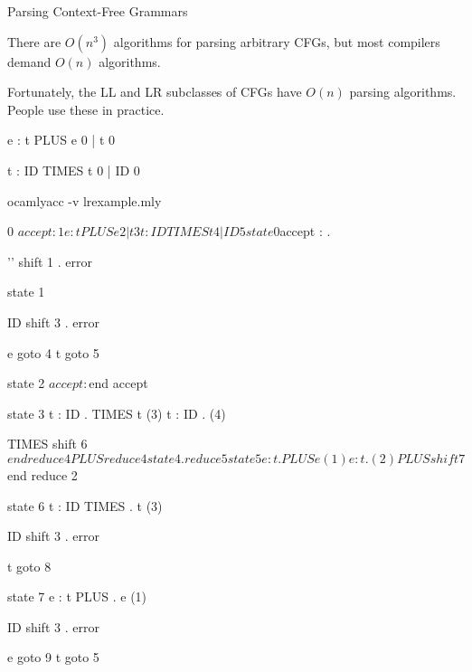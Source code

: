\documentclass{plt}
\begin{document}
\begin{frame}{Parsing Context-Free Grammars}

There are $O(n^3)$ algorithms for parsing arbitrary CFGs, but most
compilers demand $O(n)$ algorithms.

\medskip

Fortunately, the LL and LR subclasses of CFGs have $O(n)$ parsing
algorithms.  People use these in practice.

\end{frame}




e : t PLUS e { 0 }
  | t        { 0 }

t : ID TIMES t { 0 }
  | ID         { 0 }

ocamlyacc -v lrexample.mly

   0  $accept : %

   1  e : t PLUS e
   2    | t

   3  t : ID TIMES t
   4    | ID

   5  %

state 0
	$accept : . %

	''  shift 1
	.  error



state 1

	ID  shift 3
	.  error

	e  goto 4
	t  goto 5


state 2
	$accept : %

	$end  accept


state 3
	t : ID . TIMES t  (3)
	t : ID .  (4)

	TIMES  shift 6
	$end  reduce 4
	PLUS  reduce 4


state 4

	.  reduce 5


state 5
	e : t . PLUS e  (1)
	e : t .  (2)

	PLUS  shift 7
	$end  reduce 2


state 6
	t : ID TIMES . t  (3)

	ID  shift 3
	.  error

	t  goto 8


state 7
	e : t PLUS . e  (1)

	ID  shift 3
	.  error

	e  goto 9
	t  goto 5
\end{document}
